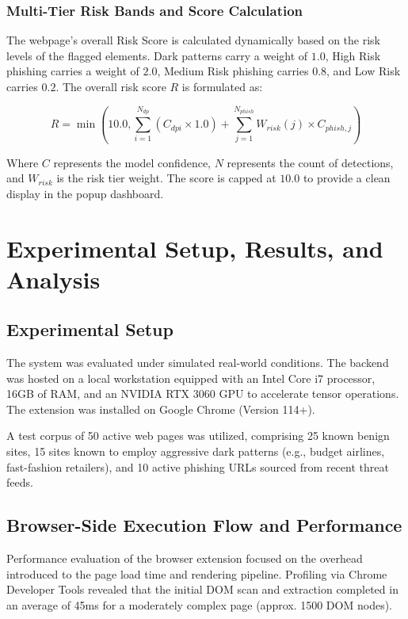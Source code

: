 \subsection{Multi-Tier Risk Bands and Score Calculation}
The webpage's overall Risk Score is calculated dynamically based on the risk levels of the flagged elements. Dark patterns carry a weight of $1.0$, High Risk phishing carries a weight of $2.0$, Medium Risk phishing carries $0.8$, and Low Risk carries $0.2$. The overall risk score $R$ is formulated as:

\begin{equation}
R = \min\left(10.0, \sum_{i=1}^{N_{dp}} (C_{dpi} \times 1.0) + \sum_{j=1}^{N_{phish}} W_{risk}(j) \times C_{phish,j} \right)
\end{equation}

Where $C$ represents the model confidence, $N$ represents the count of detections, and $W_{risk}$ is the risk tier weight. The score is capped at $10.0$ to provide a clean display in the popup dashboard.


\chapter{Experimental Setup, Results, and Analysis}

\section{Experimental Setup}
The system was evaluated under simulated real-world conditions. The backend was hosted on a local workstation equipped with an Intel Core i7 processor, 16GB of RAM, and an NVIDIA RTX 3060 GPU to accelerate tensor operations. The extension was installed on Google Chrome (Version 114+).

A test corpus of 50 active web pages was utilized, comprising 25 known benign sites, 15 sites known to employ aggressive dark patterns (e.g., budget airlines, fast-fashion retailers), and 10 active phishing URLs sourced from recent threat feeds.

\section{Browser-Side Execution Flow and Performance}
Performance evaluation of the browser extension focused on the overhead introduced to the page load time and rendering pipeline. Profiling via Chrome Developer Tools revealed that the initial DOM scan and extraction completed in an average of 45ms for a moderately complex page (approx. 1500 DOM nodes).

